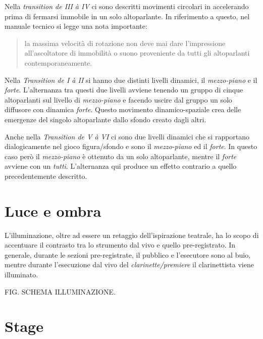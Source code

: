 \begin{table*}[h]
\begin{center}
\begin{tabular}{c c c c c}
\end{tabular}
\end{center}
\label{tab:diffiv-v}

\end{table*}

Nella \emph{transition de III à IV} ci sono descritti movimenti circolari in accelerando prima di fermarsi immobile in un solo altoparlante. In riferimento a questo, nel manuale tecnico si legge una nota importante:

\begin{quote}
{\small la massima velocità di rotazione non deve mai dare l'impressione all'ascoltatore di immobilità o suono proveniente da tutti gli altoparlanti contemporaneamente. 
}
\end{quote}

Nella \emph{Transition de I à II} si hanno due distinti livelli dinamici, il \emph{mezzo-piano} e il \emph{forte}. L'alternanza tra questi due livelli avviene tenendo un gruppo di cinque altoparlanti sul livello di \emph{mezzo-piano} e facendo uscire dal gruppo un solo diffusore con dinamica \emph{forte}. Questo movimento dinamico-spaziale crea delle emergenze del singolo altoparlante dallo sfondo creato dagli altri.

Anche nella \emph{Transition de V à VI} ci sono due livelli dinamici che si rapportano dialogicamente nel gioco figura/sfondo e sono il \emph{mezzo-piano} ed il \emph{forte}. In questo caso però il \emph{mezzo-piano} è ottenuto da un solo altoparlante, mentre il \emph{forte} avviene con un \emph{tutti}. L'alternanza qui produce un effetto contrario a quello precedentemente descritto.

\section{Luce e ombra}

L'illuminazione, oltre ad essere un retaggio dell'ispirazione teatrale, ha lo scopo di accentuare il contrasto tra lo strumento dal vivo e quello pre-registrato. In generale, durante le sezioni pre-registrate, il pubblico e l'esecutore sono al buio, mentre durante l'esecuzione dal vivo del \emph{clarinette/premiere} il clarinettista viene illuminato.

FIG. SCHEMA ILLUMINAZIONE.

\section{Stage}

